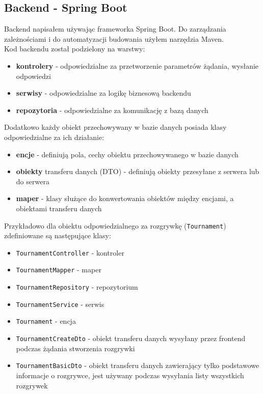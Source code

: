 \documentclass[shortabstract]{iithesis}
\begin{document}
\subsection{Backend - Spring Boot}
Backend napisałem używając frameworka Spring Boot. Do zarządzania zależnościami i do automatyzacji budowania użyłem narzędzia Maven.
\\Kod backendu został podzielony na warstwy:
\begin{itemize}
    \item \textbf{kontrolery} - odpowiedzialne za przetworzenie parametrów żądania, wysłanie odpowiedzi
    \item \textbf{serwisy} - odpowiedzialne za logikę biznesową backendu
    \item \textbf{repozytoria} - odpowiedzialne za komunikację z bazą danych
\end{itemize}
Dodatkowo każdy obiekt przechowywany w bazie danych posiada klasy odpowiedzialne za ich działanie:
\begin{itemize}
    \item \textbf{encje} - definiują pola, cechy obiektu przechowywanego w bazie danych
    \item \textbf{obiekty} transferu danych (DTO) - definiują obiekty przesyłane z serwera lub do serwera
    \item \textbf{maper} - klasy służące do konwertowania obiektów między encjami, a obiektami transferu danych
\end{itemize}
Przykładowo dla obiektu odpowiedzialnego za rozgrywkę (\texttt{Tournament}) zdefiniowane są następujące klasy:
\begin{itemize}
    \item \texttt{TournamentController} - kontroler
    \item \texttt{TournamentMapper} - maper
    \item \texttt{TournamentRepository} - repozytorium
    \item \texttt{TournamentService} - serwis
    \item \texttt{Tournament} - encja
    \item \texttt{TournamentCreateDto} - obiekt transferu danych wysyłany przez frontend podczas żądania stworzenia rozgrywki
    \item \texttt{TournamentBasicDto} - obiekt transferu danych zawierający tylko podstawowe informacje o rozgrywce, jest używany podczas wysyłania listy wszystkich rozgrywek
\end{itemize}
\end{document}
